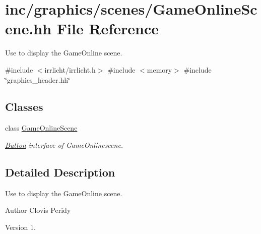\hypertarget{GameOnlineScene_8hh}{}\section{inc/graphics/scenes/\+Game\+Online\+Scene.hh File Reference}
\label{GameOnlineScene_8hh}


Use to display the Game\+Online scene.  


{\ttfamily \#include $<$irrlicht/irrlicht.\+h$>$}\newline
{\ttfamily \#include $<$memory$>$}\newline
{\ttfamily \#include \char`\"{}graphics\+\_\+header.\+hh\char`\"{}}\newline
\subsection*{Classes}
\begin{DoxyCompactItemize}
\item 
class \hyperlink{classGameOnlineScene}{Game\+Online\+Scene}
\begin{DoxyCompactList}\small\item\em \hyperlink{classButton}{Button} interface of Game\+Onlinescene. \end{DoxyCompactList}\end{DoxyCompactItemize}


\subsection{Detailed Description}
Use to display the Game\+Online scene. 

\begin{DoxyAuthor}{Author}
Clovis Peridy 
\end{DoxyAuthor}
\begin{DoxyVersion}{Version}
1. 
\end{DoxyVersion}
